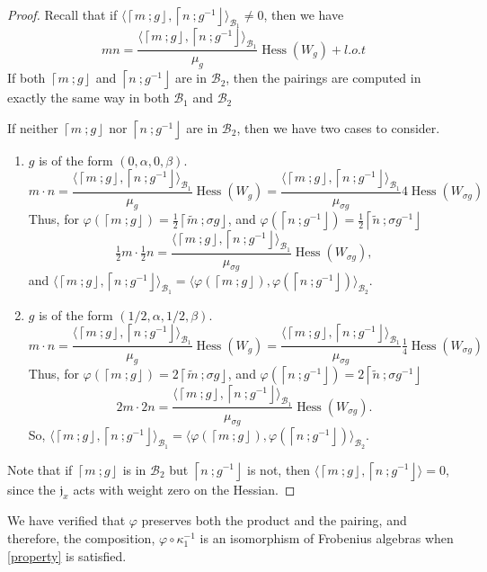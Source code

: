 \documentclass[10pt, letterpaper]{amsart}
\theoremstyle{remark}
\newcommand{\sB}{\mathscr{B}}
\newcommand{\fjrw}[2]{ \left\lceil #1 \:; #2 \right\rfloor }
\newcommand{\jw}{\mathfrak{j}}
\DeclareMathOperator{\Hess}{Hess}
\begin{document}
\begin{proof}
Recall that if $\langle \fjrw{m}{g}, \fjrw{n}{g^{-1}}\rangle_{\sB_1} \neq 0$, then we have 
\[
mn = \frac{\langle \fjrw{m}{g}, \fjrw{n}{g^{-1}}\rangle_{\sB_1}}{\mu_g}\Hess(W_g) + l.o.t
\]
 If both $\fjrw{m}{g}$ and  $\fjrw{n}{g^{-1}}$ are in $\sB_2$, then the pairings are computed in exactly the same way in both $\sB_1$ and $\sB_2$ 

If neither $\fjrw{m}{g}$ nor $\fjrw{n}{g^{-1}}$ are in $\sB_2$, then we have two cases to consider. 
\begin{enumerate}
\item $g$ is of the form $(0, \alpha, 0, \beta)$. \\
\[
m \cdot n = \frac{\langle \fjrw{m}{g}, \fjrw{n}{g^{-1}} \rangle_{\sB_1}}{\mu_g} \Hess(W_g)  = \frac{\langle \fjrw{m}{g}, \fjrw{n}{g^{-1}} \rangle_{\sB_1}}{\mu_{\sigma g}} 4 \Hess(W_{\sigma g}) 
\]
Thus, for $\varphi(\fjrw{m}{g}) = \tfrac 12 \fjrw{\tilde m}{\sigma g}$, and  $\varphi(\fjrw{n}{g^{-1}}) = \tfrac 12 \fjrw{\tilde n}{\sigma g^{-1}}$
\[
 \tfrac 12 m \cdot \tfrac 12 n   = \frac{\langle \fjrw{m}{g}, \fjrw{n}{g^{-1}} \rangle_{\sB_1}}{\mu_{\sigma g}}  \Hess(W_{\sigma g}),
\]
and $ \langle \fjrw{m}{g}, \fjrw{n}{g^{-1}} \rangle_{\sB_1} = \langle \varphi(\fjrw{m}{g}), \varphi(\fjrw{n}{g^{-1}}) \rangle_{\sB_2}$.

\item $g$ is of the form $(1/2, \alpha, 1/2, \beta)$. \\
\[
m \cdot n = \frac{\langle \fjrw{m}{g}, \fjrw{n}{g^{-1}} \rangle_{\sB_1}}{\mu_g} \Hess(W_g)  = \frac{\langle \fjrw{m}{g}, \fjrw{n}{g^{-1}} \rangle_{\sB_1}}{\mu_{\sigma g}} \tfrac 14 \Hess(W_{\sigma g}) 
\]
Thus, for $\varphi(\fjrw{m}{g}) = 2\fjrw{\tilde m}{\sigma g}$, and  $\varphi(\fjrw{n}{g^{-1}}) = 2\fjrw{\tilde n}{\sigma g^{-1}}$
\[
2m \cdot 2n   = \frac{\langle \fjrw{m}{g}, \fjrw{n}{g^{-1}} \rangle_{\sB_1}}{\mu_{\sigma g}}  \Hess(W_{\sigma g}). 
\]
So, $ \langle \fjrw{m}{g}, \fjrw{n}{g^{-1}} \rangle_{\sB_1} = \langle \varphi(\fjrw{m}{g}), \varphi(\fjrw{n}{g^{-1}}) \rangle_{\sB_2}$.
\end{enumerate}

Note that if $\fjrw{m}{g}$ is in $\sB_2$ but  $\fjrw{n}{g^{-1}}$ is not, then $\langle\fjrw{m}{g},\fjrw{n}{g^{-1}}\rangle=0$, since the $\jw_x$ acts with weight zero on the Hessian. 

\end{proof}

We have verified that $\varphi$ preserves both the product and the pairing, and therefore, the composition, $\varphi \circ \kappa_1^{-1}$ is an isomorphism of Frobenius algebras when \autoref{property} is satisfied. 
\end{document}

